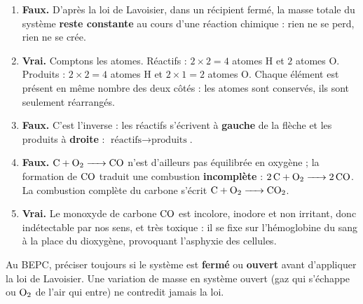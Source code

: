 \documentclass[11pt]{article}
\newcommand{\cle}[1]{{\popxbold\color{popdark}#1}}
\begin{document}
\begin{corrige}
\begin{enumerate}
    \item \textbf{Faux.} D'après la \cle{loi de Lavoisier}, dans un récipient fermé, la masse totale du système \textbf{reste constante} au cours d'une réaction chimique : rien ne se perd, rien ne se crée.
    \item \textbf{Vrai.} Comptons les atomes. Réactifs : $2 \times 2 = 4$ atomes H et $2$ atomes O. Produits : $2 \times 2 = 4$ atomes H et $2 \times 1 = 2$ atomes O. Chaque élément est présent en même nombre des deux côtés : les atomes sont conservés, ils sont seulement réarrangés.
    \item \textbf{Faux.} C'est l'inverse : les \cle{réactifs} s'écrivent à \textbf{gauche} de la flèche et les \cle{produits} à \textbf{droite} : $\text{réactifs} \to \text{produits}$.
    \item \textbf{Faux.} $\ce{C + O2 -> CO}$ n'est d'ailleurs pas équilibrée en oxygène ; la formation de $\ce{CO}$ traduit une combustion \textbf{incomplète} : $\ce{2C + O2 -> 2CO}$. La combustion complète du carbone s'écrit $\ce{C + O2 -> CO2}$.
    \item \textbf{Vrai.} Le monoxyde de carbone $\ce{CO}$ est incolore, inodore et non irritant, donc indétectable par nos sens, et très toxique : il se fixe sur l'hémoglobine du sang à la place du dioxygène, provoquant l'asphyxie des cellules.
\end{enumerate}
\end{corrige}

\begin{attention}
Au BEPC, préciser toujours si le système est \textbf{fermé} ou \textbf{ouvert} avant d'appliquer la loi de Lavoisier. Une variation de masse en système ouvert (gaz qui s'échappe ou $\ce{O2}$ de l'air qui entre) ne contredit jamais la loi.
\end{attention}
\end{document}
